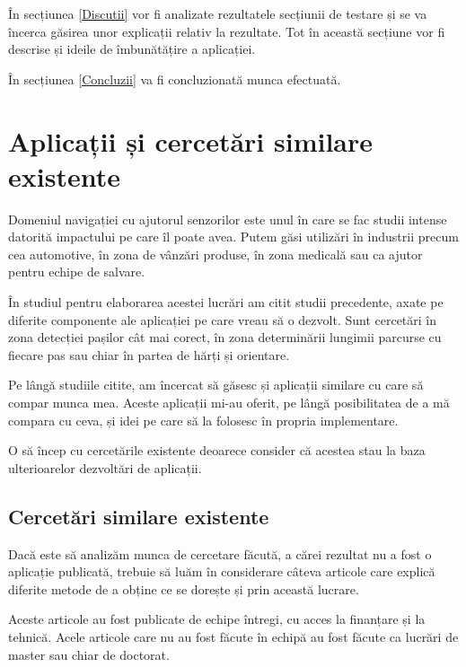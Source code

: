 \documentclass[12pt,a4paper]{article}
\begin{document}
În secțiunea \ref{Discutii} vor fi analizate rezultatele secțiunii de testare și se va încerca găsirea unor explicații relativ la rezultate. Tot în această secțiune vor fi descrise și ideile de îmbunătățire a aplicației.

În secțiunea \ref{Concluzii} va fi concluzionată munca efectuată.

\newpage


\section{Aplicații și cercetări similare existente} \label{AplicatiiCercetariSimilare}
Domeniul navigației cu ajutorul senzorilor este unul în care se fac studii intense datorită impactului pe care îl poate avea. Putem găsi utilizări în industrii precum cea automotive, în zona de vânzări produse, în zona medicală sau ca ajutor pentru echipe de salvare.

În studiul pentru elaborarea acestei lucrări am citit studii precedente, axate pe diferite componente ale aplicației pe care vreau să o dezvolt. Sunt cercetări în zona detecției pașilor cât mai corect, în zona determinării lungimii parcurse cu fiecare pas sau chiar în partea de hărți și orientare.

Pe lângă studiile citite, am încercat să găsesc și aplicații similare cu care să compar munca mea. Aceste aplicații mi-au oferit, pe lângă posibilitatea de a mă compara cu ceva, și idei pe care să la folosesc în propria implementare.

O să încep cu cercetările existente deoarece consider că acestea stau la baza ulterioarelor dezvoltări de aplicații.

\subsection{Cercetări similare existente}
Dacă este să analizăm munca de cercetare făcută, a cărei rezultat nu a fost o aplicație publicată, trebuie să luăm în considerare câteva articole care explică diferite metode de a obține ce se dorește și prin această lucrare.

Aceste articole au fost publicate de echipe întregi, cu acces la finanțare și la tehnică. Acele articole care nu au fost făcute în echipă au fost făcute ca lucrări de master sau chiar de doctorat. %
\end{document}
